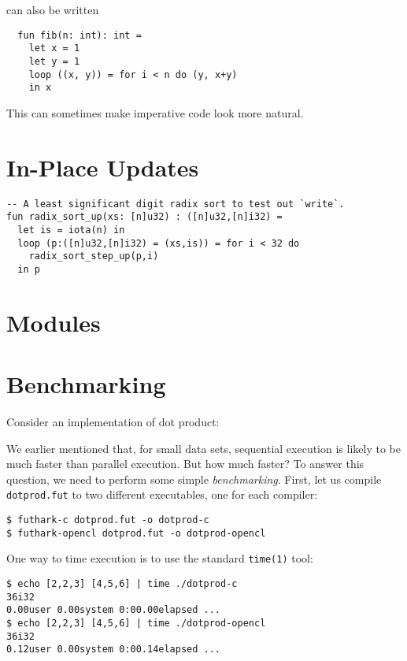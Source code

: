 \documentclass[11pt]{book}
\begin{document}
can also be written

\begin{lstlisting}
  fun fib(n: int): int =
    let x = 1
    let y = 1
    loop ((x, y)) = for i < n do (y, x+y)
    in x
\end{lstlisting}

This can sometimes make imperative code look more natural.

\section{In-Place Updates}
\label{sec:in-place-updates}

\begin{lstlisting}
-- A least significant digit radix sort to test out `write`.
fun radix_sort_up(xs: [n]u32) : ([n]u32,[n]i32) =
  let is = iota(n) in
  loop (p:([n]u32,[n]i32) = (xs,is)) = for i < 32 do
    radix_sort_step_up(p,i)
  in p
\end{lstlisting}


\section{Modules}

\section{Benchmarking}
\label{sec:benchmarking}

Consider an implementation of dot product:



We earlier mentioned that, for small data sets, sequential execution
is likely to be much faster than parallel execution.  But how much
faster?  To answer this question, we need to perform some simple
\textit{benchmarking}.  First, let us compile \texttt{dotprod.fut} to
two different executables, one for each compiler:

\begin{verbatim}
$ futhark-c dotprod.fut -o dotprod-c
$ futhark-opencl dotprod.fut -o dotprod-opencl
\end{verbatim}

One way to time execution is to use the standard \texttt{time(1)}
tool:

\begin{verbatim}
$ echo [2,2,3] [4,5,6] | time ./dotprod-c
36i32
0.00user 0.00system 0:00.00elapsed ...
$ echo [2,2,3] [4,5,6] | time ./dotprod-opencl
36i32
0.12user 0.00system 0:00.14elapsed ...
\end{verbatim}
\end{document}
